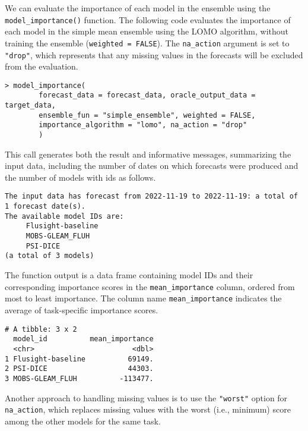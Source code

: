 \documentclass[
  article,
  shortnames,
  notitle]{jss}
\begin{document}
\normalsize

We can evaluate the importance of each model in the ensemble using the
\texttt{model\_importance()} function. The following code evaluates the
importance of each model in the simple mean ensemble using the LOMO
algorithm, without training the ensemble (\texttt{weighted\ =\ FALSE}).
The \texttt{na\_action} argument is set to \texttt{"drop"}, which
represents that any missing values in the forecasts will be excluded
from the evaluation.

\begin{verbatim}
> model_importance(
        forecast_data = forecast_data, oracle_output_data = target_data,
        ensemble_fun = "simple_ensemble", weighted = FALSE,
        importance_algorithm = "lomo", na_action = "drop"
        )
\end{verbatim}

This call generates both the result and informative messages,
summarizing the input data, including the number of dates on which
forecasts were produced and the number of models with ids as follows.

\small

\begin{verbatim}
The input data has forecast from 2022-11-19 to 2022-11-19: a total of 1 forecast date(s).
The available model IDs are:
     Flusight-baseline
     MOBS-GLEAM_FLUH
     PSI-DICE 
(a total of 3 models)
\end{verbatim}

\normalsize

The function output is a data frame containing model IDs and their
corresponding importance scores in the \texttt{mean\_importance} column,
ordered from most to least importance. The column name
\texttt{mean\_importance} indicates the average of task-specific
importance scores.

\small

\begin{verbatim}
# A tibble: 3 x 2
  model_id          mean_importance
  <chr>                       <dbl>
1 Flusight-baseline          69149.
2 PSI-DICE                   44303.
3 MOBS-GLEAM_FLUH          -113477.
\end{verbatim}

\normalsize

Another approach to handling missing values is to use the
\texttt{"worst"} option for \texttt{na\_action}, which replaces missing
values with the worst (i.e., minimum) score among the other models for
the same task.
\end{document}
